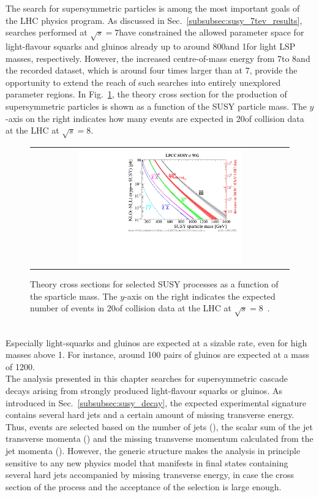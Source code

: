 The search for supersymmetric particles is among the most important goals of the LHC physics program. As discussed in Sec.~\ref{subsubsec:susy_7tev_results}, searches performed at $\sqrt{s} = 7$\tev have constrained the allowed parameter space for light-flavour squarks and gluinos already up to around 800\gev and 1\tev for light LSP masses, respectively. However, the increased centre-of-mass energy from 7\tev to 8\tev and the recorded dataset, which is around four times larger than at 7\tev, provide the opportunity to extend the reach of such searches into entirely unexplored parameter regions. In Fig.~\ref{fig:susy_theory_xs}, the theory cross section for the production of supersymmetric particles is shown as a function of the SUSY particle mass. The $y$-axis on the right indicates how many events are expected in 20\fbinv of \pp collision data at the LHC at $\sqrt{s}=8$\tev. 
\begin{figure}[!h]
  \centering
  \begin{tabular}{c}
                \includegraphics[width=0.65\textwidth]{figures/xsections_strong.pdf} 
  \end{tabular}
  \caption{Theory cross sections for selected SUSY processes as a function of the sparticle mass. The $y$-axis on the right indicates the expected number of events in 20\fbinv of \pp collision data at the LHC at $\sqrt{s}=8$\tev~\cite{Kramer:2012bx}.}
  \label{fig:susy_theory_xs}
\end{figure}
\\
Especially light-squarks and gluinos are expected at a sizable rate, even for high masses above 1\tev. For instance, around 100 pairs of gluinos are expected at a mass of 1200\gev. \\
The analysis presented in this chapter searches for supersymmetric cascade decays arising from strongly produced light-flavour squarks or gluinos. As introduced in Sec.~\ref{subsubsec:susy_decay}, the expected experimental signature contains several hard jets and a certain amount of missing transverse energy. Thus, events are selected based on the number of jets (\NJets), the scalar sum of the jet transverse momenta (\HT) and the missing transverse momentum calculated from the jet momenta (\MHT). However, the generic structure makes the analysis in principle sensitive to any new physics model that manifests in final states containing several hard jets accompanied by missing transverse energy, in case the cross section of the process and the acceptance of the selection is large enough. \\
